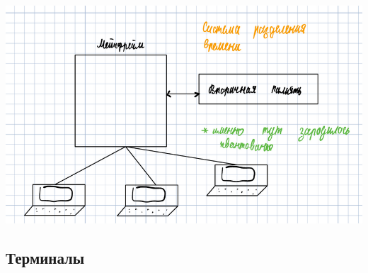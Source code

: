 \documentclass[14pt, a4paper]{article}
\begin{document}
	\includegraphics[width=\linewidth]{1}
	
	\subsection*{Терминалы}
\end{document}
